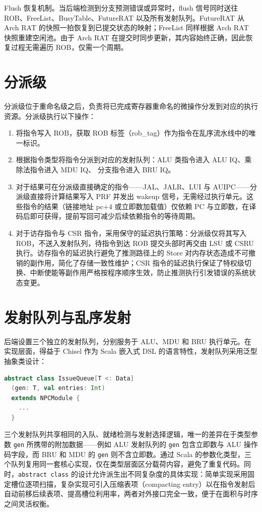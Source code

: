 Flush 恢复机制。当后端检测到分支预测错误或异常时，flush 信号同时送往 ROB、FreeList、BusyTable、FutureRAT 以及所有发射队列。FutureRAT 从 Arch RAT 的快照一拍恢复到已提交状态的映射；FreeList 同样根据 Arch RAT 快照重建空闲池。由于 Arch RAT 在提交时同步更新，其内容始终正确，因此恢复过程无需遍历 ROB，仅需一个周期。

\section{分派级}

分派级位于重命名级之后，负责将已完成寄存器重命名的微操作分发到对应的执行资源。分派级执行以下操作：

\begin{enumerate}
  \item 将指令写入 ROB，获取 ROB 标签（rob\_tag）作为指令在乱序流水线中的唯一标识。
  \item 根据指令类型将指令分派到对应的发射队列：ALU 类指令进入 ALU IQ、乘除法指令进入 MDU IQ、 分支指令进入 BRU IQ。
  \item 对于结果可在分派级直接确定的指令——JAL、JALR、LUI 与 AUIPC——分派级直接将计算结果写入 PRF 并发出 wakeup 信号，无需经过执行单元。这些指令的结果（链接地址 pc+4 或立即数加载值）仅依赖 PC 与立即数，在译码后即可获得，提前写回可减少后续依赖指令的等待周期。
  \item 对于访存指令与 CSR 指令，采用保守的延迟执行策略：分派级仅将其写入 ROB，不送入发射队列，待指令到达 ROB 提交头部时再交由 LSU 或 CSRU 执行。访存指令的延迟执行避免了推测路径上的 Store 对内存状态造成不可撤销的副作用，简化了存储一致性维护；CSR 指令的延迟执行保证了特权级切换、中断使能等副作用严格按程序顺序生效，防止推测执行引发错误的系统状态变更。
\end{enumerate}

\section{发射队列与乱序发射}

后端设置三个独立的发射队列，分别服务于 ALU、MDU 和 BRU 执行单元。在实现层面，得益于 Chisel 作为 Scala 嵌入式 DSL 的语言特性，发射队列采用泛型抽象类设计：

\begin{lstlisting}[language=Scala,caption={泛型发射队列抽象类定义},label={lst:issue-queue-abs}]
abstract class IssueQueue[T <: Data]
  (gen: T, val entries: Int)
  extends NPCModule {
    ...
  }
\end{lstlisting}

三个发射队列共享相同的入队、就绪检测与发射选择逻辑，唯一的差异在于类型参数 \lstinline|gen| 所携带的附加数据——例如 ALU 发射队列的 \lstinline|gen| 包含立即数与 ALU 操作码字段，而 BRU 和 MDU 的 \lstinline|gen| 则不含立即数。通过 Scala 的参数化类型，三个队列复用同一套核心实现，仅在类型层面区分载荷内容，避免了重复代码。同时，\lstinline|abstract class| 的设计允许派生出不同复杂度的具体实现：简单实现采用固定槽位逐项扫描，复杂实现可引入压缩表项（compacting entry）以在指令发射后自动前移后续表项、提高槽位利用率，两者对外接口完全一致，便于在面积与时序之间灵活权衡。

